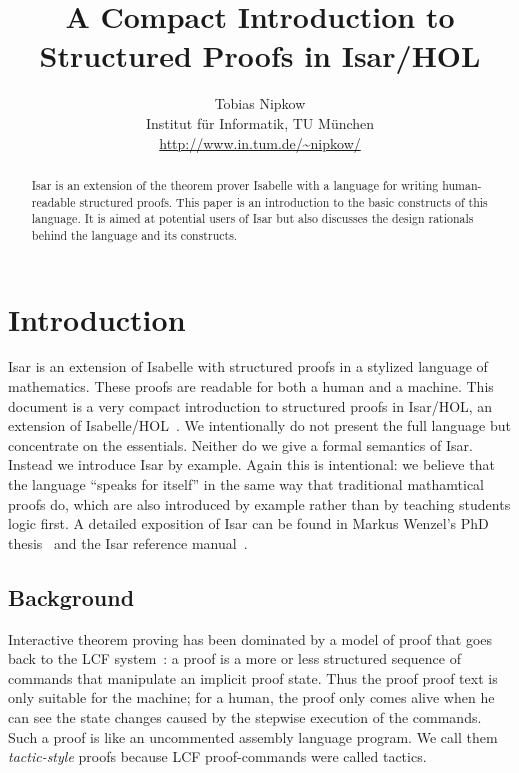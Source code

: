 \documentclass[11pt,a4paper]{article}
\begin{document}
\title{A Compact Introduction to Structured Proofs in Isar/HOL}
\author{Tobias Nipkow\\Institut f{\"u}r Informatik, TU M{\"u}nchen\\
 {\small\url{http://www.in.tum.de/~nipkow/}}}
\date{}
\maketitle

\begin{abstract}
  Isar is an extension of the theorem prover Isabelle with a language
  for writing human-readable structured proofs. This paper is an
  introduction to the basic constructs of this language. It is aimed
  at potential users of Isar but also discusses the design rationals
  behind the language and its constructs.
\end{abstract}

\section{Introduction}

Isar is an extension of Isabelle with structured proofs in a stylized
language of mathematics. These proofs are readable for both a human
and a machine.  This document is a very compact introduction to
structured proofs in Isar/HOL, an extension of
Isabelle/HOL~\cite{LNCS2283}. We intentionally do not present the full
language but concentrate on the essentials. Neither do we give a
formal semantics of Isar. Instead we introduce Isar by example. Again
this is intentional: we believe that the language ``speaks for
itself'' in the same way that traditional mathamtical proofs do, which
are also introduced by example rather than by teaching students logic
first. A detailed exposition of Isar can be found in Markus Wenzel's
PhD thesis~\cite{Wenzel-PhD} and the Isar reference
manual~\cite{Isar-Ref-Man}.

\subsection{Background}

Interactive theorem proving has been dominated by a model of proof
that goes back to the LCF system~\cite{LCF}: a proof is a more or less
structured sequence of commands that manipulate an implicit proof
state. Thus the proof proof text is only suitable for the machine; for
a human, the proof only comes alive when he can see the state changes
caused by the stepwise execution of the commands. Such a proof is like
an uncommented assembly language program. We call them
\emph{tactic-style} proofs because LCF proof-commands were called
tactics.
\end{document}
